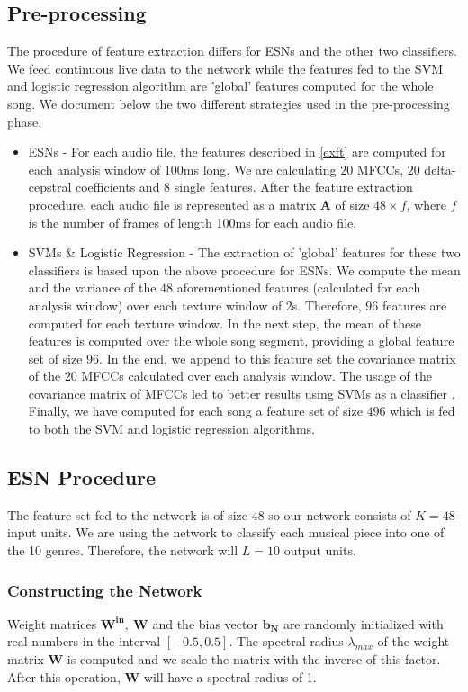 \documentclass[a4paper,11pt,oneside]{article}
\begin{document}
\subsection{Pre-processing}
The procedure of feature extraction differs for ESNs and the other two classifiers.
We feed continuous live data to the network while the features fed to the SVM and logistic regression
algorithm are 'global' features computed for the whole song. We document below the two different strategies
used in the pre-processing phase.
\begin{itemize}
  \item ESNs - For each audio file, the features described in \ref{exft} are computed for 
  each analysis window of 100ms long. We are calculating $20$ MFCCs, $20$ delta-cepstral
  coefficients and $8$ single features. After the feature extraction procedure, each audio file
  is represented as a matrix $\mathbf{A}$ of size $48\times f$, where $f$ is the number of frames
  of length 100ms for each audio file. 
  \item SVMs \& Logistic Regression - The extraction of 'global' features for these two classifiers 
  is based upon the above procedure for ESNs. We compute the mean and the variance of the $48$
  aforementioned features (calculated for each analysis window) over each texture window of 2s.
  Therefore, $96$ features are computed for each texture window. In the next step, the mean of these
  features is computed over the whole song segment, providing a global feature set of size $96$.
  In the end, we append to this feature set the covariance matrix of the $20$ MFCCs
  calculated over each analysis window. The usage of the covariance matrix of MFCCs led to better results
  using SVMs as a classifier \cite{ellis}. Finally, we have computed for each song a feature set of size $496$ which
  is fed to both the SVM and logistic regression algorithms.
\end{itemize}
\subsection{ESN Procedure}
The feature set fed to the network is of size $48$ so our network consists of $K=48$
input units. We are using the network to classify each musical piece into one of the 10 genres.
Therefore, the network will $L=10$ output units.
\subsubsection*{Constructing the Network}
Weight matrices $\mathbf{W^{in},\ W}$ and the bias vector $\mathbf{b_N}$ are randomly initialized with real numbers
in the interval $[-0.5,0.5]$. The spectral radius $\lambda_{max}$ of the weight matrix $\mathbf{W}$ is computed 
and we scale the matrix with the inverse of this factor. After this operation, $\mathbf{W}$ will have a spectral 
radius of 1.
\end{document}
